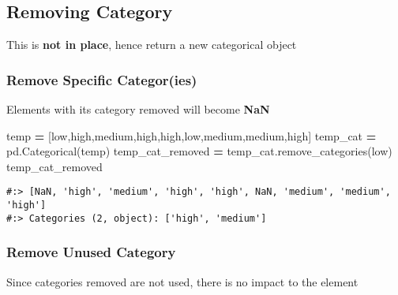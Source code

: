 \documentclass[
]{book}
\newenvironment{Shaded}{\begin{snugshade}}{\end{snugshade}}
\newcommand{\NormalTok}[1]{#1}
\newcommand{\OperatorTok}[1]{\textcolor[rgb]{0.43,0.43,0.43}{\textbf{#1}}}
\newcommand{\StringTok}[1]{\textcolor[rgb]{0.5,0.5,0.5}{#1}}
\begin{document}
\hypertarget{removing-category}{%
\subsection{Removing Category}\label{removing-category}}

This is \textbf{not in place}, hence return a new categorical object

\hypertarget{remove-specific-categories}{%
\subsubsection{Remove Specific Categor(ies)}\label{remove-specific-categories}}

Elements with its category removed will become \textbf{NaN}

\begin{Shaded}
\begin{Highlighting}[]
\NormalTok{temp }\OperatorTok{=}\NormalTok{ [}\StringTok{\textquotesingle{}low\textquotesingle{}}\NormalTok{,}\StringTok{\textquotesingle{}high\textquotesingle{}}\NormalTok{,}\StringTok{\textquotesingle{}medium\textquotesingle{}}\NormalTok{,}\StringTok{\textquotesingle{}high\textquotesingle{}}\NormalTok{,}\StringTok{\textquotesingle{}high\textquotesingle{}}\NormalTok{,}\StringTok{\textquotesingle{}low\textquotesingle{}}\NormalTok{,}\StringTok{\textquotesingle{}medium\textquotesingle{}}\NormalTok{,}\StringTok{\textquotesingle{}medium\textquotesingle{}}\NormalTok{,}\StringTok{\textquotesingle{}high\textquotesingle{}}\NormalTok{]}
\NormalTok{temp\_cat }\OperatorTok{=}\NormalTok{ pd.Categorical(temp)}
\NormalTok{temp\_cat\_removed }\OperatorTok{=}\NormalTok{ temp\_cat.remove\_categories(}\StringTok{\textquotesingle{}low\textquotesingle{}}\NormalTok{)}
\NormalTok{temp\_cat\_removed}
\end{Highlighting}
\end{Shaded}

\begin{verbatim}
#:> [NaN, 'high', 'medium', 'high', 'high', NaN, 'medium', 'medium', 'high']
#:> Categories (2, object): ['high', 'medium']
\end{verbatim}

\hypertarget{remove-unused-category}{%
\subsubsection{Remove Unused Category}\label{remove-unused-category}}

Since categories removed are not used, there is no impact to the element
\end{document}
